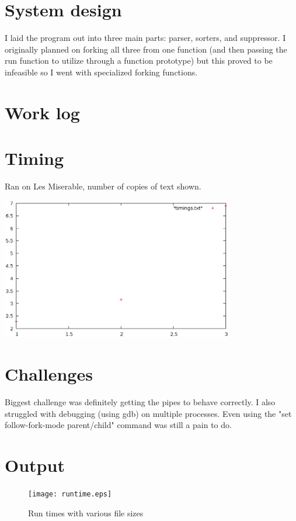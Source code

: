 \documentclass[letterpaper,10pt,titlepage]{article}
\begin{document}
\section{System design}
I laid the program out into three main parts: parser, sorters, and suppressor.
I originally planned on forking all three from one function (and then passing the
run function to utilize through a function prototype) but this proved to be
infeasible so I went with specialized forking functions.

\section{Work log}


\section{Timing}
Ran on Les Miserable, number of copies of text shown.
\begin{center}
\includegraphics[width=4in]{graph.eps}
\end{center}

\section{Challenges}
Biggest challenge was definitely getting the pipes to behave correctly. I also
struggled with debugging (using gdb) on multiple processes. Even using the
"set follow-fork-mode parent/child" command was still a pain to do.

\section{Output}
\begin{figure}[H]
	\caption{Run times with various file sizes}
	\texttt{[image: runtime.eps]}
\end{figure}
\end{document}
